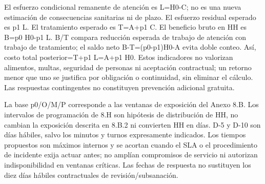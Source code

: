 El esfuerzo condicional remanente de atención es L=H0-C; no es una nueva estimación de consecuencias sanitarias ni de plazo. El esfuerzo residual esperado es p1 L. El tratamiento esperado es T=A+p1 C. El beneficio bruto en HH es B=p0 H0-p1 L. B/T compara reducción esperada de trabajo de atención con trabajo de tratamiento; el saldo neto B-T=(p0-p1)H0-A evita doble conteo. Así, costo total posterior=T+p1 L=A+p1 H0. Estos indicadores no valorizan alimentos, multas, seguridad de personas ni aceptación contractual; un retorno menor que uno se justifica por obligación o continuidad, sin eliminar el cálculo. Las respuestas contingentes no constituyen prevención adicional gratuita.

La base p0/O/M/P corresponde a las ventanas de exposición del Anexo 8.B. Los intervalos de programación de 8.H son hipótesis de distribución de HH, no cambian la exposición descrita en 8.B.2 ni convierten HH en días. D-5 y D-10 son días hábiles, salvo los minutos y turnos expresamente indicados. Los tiempos propuestos son máximos internos y se acortan cuando el SLA o el procedimiento de incidente exija actuar antes; no amplían compromisos de servicio ni autorizan indisponibilidad en ventanas críticas. Las fechas de respuesta no sustituyen los diez días hábiles contractuales de revisión/subsanación.

